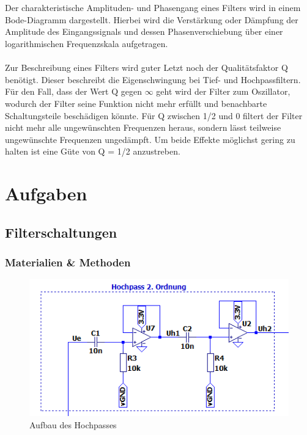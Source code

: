 \\
\\
Der charakteristische Amplituden- und Phasengang eines Filters wird in einem Bode-Diagramm dargestellt. Hierbei wird die Verstärkung oder Dämpfung der Amplitude des Eingangssignals und dessen Phasenverschiebung über einer logarithmischen Frequenzskala aufgetragen. \cite{tkotz} \cite{tietze} 
\\
\\
Zur Beschreibung eines Filters wird guter Letzt noch der Qualitätsfaktor Q benötigt. Dieser beschreibt die Eigenschwingung bei Tief- und Hochpassfiltern. Für den Fall, dass der Wert Q gegen $\infty$ geht wird der Filter zum Oszillator, wodurch der Filter seine Funktion nicht mehr erfüllt und benachbarte Schaltungsteile beschädigen könnte. Für Q zwischen 1/2 und 0 filtert der Filter nicht mehr alle ungewünschten Frequenzen heraus, sondern lässt teilweise ungewünschte Frequenzen ungedämpft. Um beide Effekte möglichst gering zu halten ist eine Güte von Q = 1/2 anzustreben. \cite{tkotz} \cite{lutz} \cite{tietze} 

\clearpage
\section{Aufgaben}

\subsection{Filterschaltungen}

\subsubsection{Materialien \& Methoden}

\begin{figure}[htb]
    \includegraphics[width=14cm]{./pictures/Hochpass}
    \caption{Aufbau des Hochpasses}
    \label{fig:Hochpass}
\end{figure}


